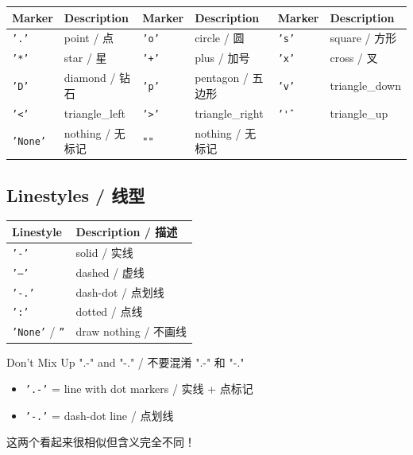 \documentclass[11pt,a4paper]{article}
\begin{document}
\begin{table}[h]
\centering
\small
\renewcommand{\arraystretch}{1.2}
\begin{tabular}{@{}llllll@{}}
\toprule
\textbf{Marker} & \textbf{Description} & \textbf{Marker} & \textbf{Description} & \textbf{Marker} & \textbf{Description} \\ \midrule
\texttt{'.'} & point / 点 & \texttt{'o'} & circle / 圆 & \texttt{'s'} & square / 方形 \\
\texttt{'*'} & star / 星 & \texttt{'+'} & plus / 加号 & \texttt{'x'} & cross / 叉 \\
\texttt{'D'} & diamond / 钻石 & \texttt{'p'} & pentagon / 五边形 & \texttt{'v'} & triangle\_down \\
\texttt{'<'} & triangle\_left & \texttt{'>'} & triangle\_right & \texttt{'\^'} & triangle\_up \\
\texttt{'None'} & nothing / 无标记 & \texttt{""} & nothing / 无标记 & & \\ \bottomrule
\end{tabular}
\end{table}

\subsection{Linestyles / 线型}

\begin{table}[h]
\centering
\renewcommand{\arraystretch}{1.3}
\begin{tabular}{@{}ll@{}}
\toprule
\textbf{Linestyle} & \textbf{Description / 描述} \\ \midrule
\texttt{'-'}  & solid / 实线 \\
\texttt{'--'} & dashed / 虚线 \\
\texttt{'-.'} & dash-dot / 点划线 \\
\texttt{':'}  & dotted / 点线 \\
\texttt{'None'} / \texttt{''} & draw nothing / 不画线 \\ \bottomrule
\end{tabular}
\end{table}

\begin{warning}{Don't Mix Up ".-" and "-." / 不要混淆 ".-" 和 "-."}
    \begin{itemize}
        \item \texttt{'.-'} = line with dot markers / 实线 + 点标记
        \item \texttt{'-.'} = dash-dot line / 点划线
    \end{itemize}
    这两个看起来很相似但含义完全不同！
\end{warning}
\end{document}
